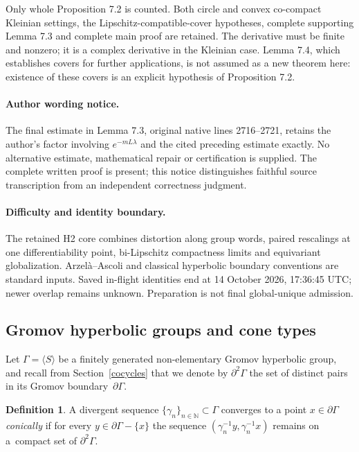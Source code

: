 \documentclass[10pt,a4paper]{article}
\theoremstyle{definition}
\newtheorem{defi}[prop]{Definition}
\renewcommand{\sf}[1]{{\mathsf{#1}}}
\newcommand{\G}{\sf{\Gamma}}
\newcommand{\N}{\mathbb{N}}
\newcommand{\g}{\gamma}
\newcommand{\bord}{\partial}
\renewcommand{\/}{\backslash}
\newcommand{\<}{\langle}
\renewcommand{\>}{\rangle}
\numberwithin{equation}{section}
\begin{document}
Only whole Proposition 7.2 is counted. Both circle and convex co-compact Kleinian settings, the Lipschitz-compatible-cover hypotheses, complete supporting Lemma 7.3 and complete main proof are retained. The derivative must be finite and nonzero; it is a complex derivative in the Kleinian case. Lemma 7.4, which establishes covers for further applications, is not assumed as a new theorem here: existence of these covers is an explicit hypothesis of Proposition 7.2.

\paragraph{Author wording notice.} The final estimate in Lemma 7.3, original native lines 2716--2721, retains the author's factor involving $e^{-mL\lambda}$ and the cited preceding estimate exactly. No alternative estimate, mathematical repair or certification is supplied. The complete written proof is present; this notice distinguishes faithful source transcription from an independent correctness judgment.

\paragraph{Difficulty and identity boundary.} The retained H2 core combines distortion along group words, paired rescalings at one differentiability point, bi-Lipschitz compactness limits and equivariant globalization. Arzel\`a--Ascoli and classical hyperbolic boundary conventions are standard inputs. Saved in-flight identities end at 14 October 2026, 17:36:45 UTC; newer overlap remains unknown. Preparation is not final global-unique admission.

\setcounter{section}{4}\setcounter{subsection}{0}\setcounter{prop}{0}

\subsection{Gromov hyperbolic groups and cone types}\label{cont}
Let $\G=\langle S\rangle$ be a finitely generated non-elementary Gromov hyperbolic group, and recall from Section~\ref{cocycles} that we denote by $\bord^2\G$ the set of distinct pairs in its Gromov boundary~$\bord\G$.



\begin{defi}\label{conicalsequence}
A divergent sequence $\{\g_n\}_{n\in\N}\subset\G$ converges to a point $x\in\bord\G$ \emph{conically} if for every $y\in\bord\G-\{x\}$ the sequence $(\g_n^{-1}y,\g_n^{-1}x)$ remains on a~compact set of $\bord^2\G$.
\end{defi}
\end{document}
